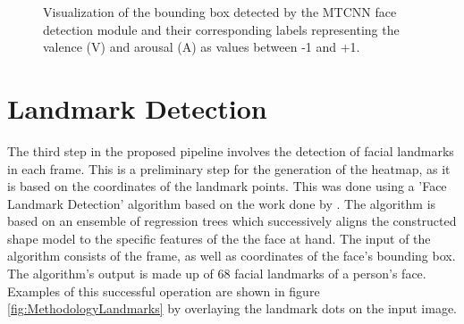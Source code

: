 \begin{figure}[H]
  \hfill
  \hfill
  \caption{Visualization of the bounding box detected by the MTCNN face detection module \citep{Zhang:2016:MTCCN} and their corresponding labels representing the valence (V) and arousal (A) as values between -1 and +1.}
  \label{fig:MethodologyBoundingBox}
\end{figure}



\section{Landmark Detection}
The third step in the proposed pipeline involves the detection of facial landmarks in each frame. This is a preliminary step for the generation of the heatmap, as it is based on the coordinates of the landmark points.
\newline\newline
This was done using a 'Face Landmark Detection' algorithm based on the work done by \citet{Kazemi:2014:ShapePredictor}. The algorithm is based on an ensemble of regression trees which successively aligns the constructed shape model to the specific features of the the face at hand.
\newline\newline
The input of the algorithm consists of the frame, as well as coordinates of the face's bounding box. The algorithm's output is made up of 68 facial landmarks of a person's face. Examples of this successful operation are shown in figure \ref{fig:MethodologyLandmarks} by overlaying the landmark dots on the input image.
\citep{Datahacker:2020:DlibFacialLandmarks}

